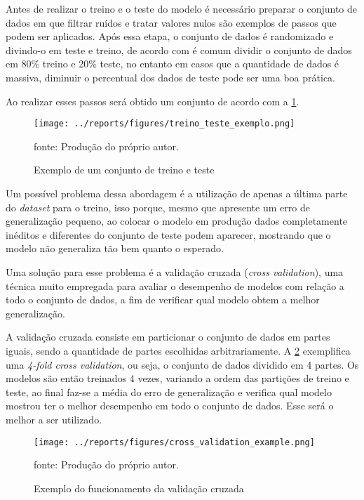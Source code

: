 \documentclass[
  12pt,		%
  a4paper,	%
  openright,%
  oneside,	%
  chapter=TITLE,		%
  section=TITLE,		%
  english,	%
  french,	%
  spanish,	%
  brazil	%
]{abntex2}
\begin{document}
    Antes de realizar o treino e o teste do modelo é necessário preparar o conjunto de dados em que filtrar ruídos e tratar valores
    nulos são exemplos de passos que podem ser aplicados. Após essa etapa, o conjunto de dados é randomizado
    e divindo-o em teste e treino, de acordo com \cite[]{hands_on_ml} é comum dividir o conjunto de dados em 80\% treino
    e 20\% teste, no entanto em casos que a quantidade de dados é massiva, diminuir o percentual dos dados de teste pode ser
    uma boa prática.

    Ao realizar esses passos será obtido um conjunto de acordo com a \ref*{exemplo_treino_teste}.

    \begin{figure}[ht]
        \centering
        \caption{Exemplo de um conjunto de treino e teste}
        \texttt{[image: ../reports/figures/treino\_teste\_exemplo.png]}
        \label{exemplo_treino_teste}
        \par
        {\small fonte: Produção do próprio autor.}
    \end{figure}

    Um possível problema dessa abordagem é a utilização de apenas a última parte do \textit{dataset} para o treino, isso porque,
    mesmo que apresente um erro de generalização pequeno, ao colocar o modelo em produção dados completamente inéditos e diferentes
    do conjunto de teste podem aparecer, mostrando que o modelo não generaliza tão bem quanto o esperado.

    Uma solução para esse problema é a validação cruzada (\textit{cross validation}), uma técnica muito empregada para avaliar o desempenho de
    modelos com relação a todo o conjunto de dados, a fim de verificar qual modelo obtem a melhor generalização.

    A validação cruzada consiste em particionar o conjunto de dados em partes iguais, sendo a quantidade de partes escolhidas
    arbitrariamente. A \ref*{exemplo_cross_val} exemplifica uma \textit{4-fold cross validation}, ou seja, o conjunto de dados
    dividido em 4 partes. Os modelos são então treinados 4 vezes, variando a ordem das partições de treino e teste, ao final
    faz-se a média do erro de generalização e verifica qual modelo mostrou ter o melhor desempenho em todo o conjunto de dados.
    Esse será o melhor a ser utilizado.

    \begin{figure}[ht]
        \centering
        \caption{Exemplo do funcionamento da validação cruzada}
        \texttt{[image: ../reports/figures/cross\_validation\_example.png]}
        \label{exemplo_cross_val}
        \par
        {\small fonte: Produção do próprio autor.}
    \end{figure}
    
\end{document}
